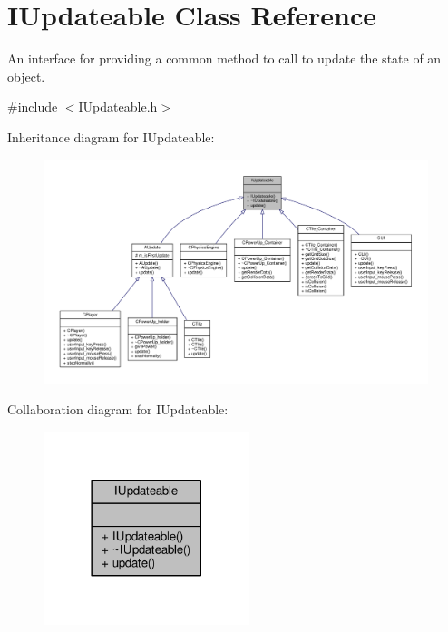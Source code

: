 \hypertarget{classIUpdateable}{\section{I\-Updateable Class Reference}
\label{classIUpdateable}
}


An interface for providing a common method to call to update the state of an object.  




{\ttfamily \#include $<$I\-Updateable.\-h$>$}



Inheritance diagram for I\-Updateable\-:
\nopagebreak
\begin{figure}[H]
\begin{center}
\leavevmode
\includegraphics[width=350pt]{classIUpdateable__inherit__graph}
\end{center}
\end{figure}


Collaboration diagram for I\-Updateable\-:\nopagebreak
\begin{figure}[H]
\begin{center}
\leavevmode
\includegraphics[width=170pt]{classIUpdateable__coll__graph}
\end{center}
\end{figure}
